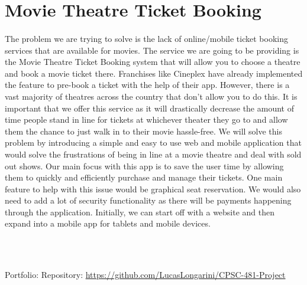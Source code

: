 \documentclass{article}
\begin{document}
\section{Movie Theatre Ticket Booking}
\paragraph{}
The problem we are trying to solve is the lack of online/mobile ticket booking services that are available for movies. The service we are going to be providing is the Movie Theatre Ticket Booking system that will allow you to choose a theatre and book a movie ticket there. Franchises like Cineplex have already implemented the feature to pre-book a ticket with the help of their app. However, there is a vast majority of theatres across the country that don’t allow you to do this. It is important that we offer this service as it will drastically decrease the amount of time people stand in line for tickets at whichever theater they go to and allow them the chance to just walk in to their movie hassle-free. We will solve this problem by introducing a simple and easy to use web and mobile application that would solve the frustrations of being in line at a movie theatre and deal with sold out shows. Our main focus with this app is to save the user time by allowing them to quickly and efficiently purchase and manage their tickets. One main feature to help with this issue would be graphical seat reservation. We would also need to add a lot of security functionality as there will be payments happening through the application. Initially,  we can start off with a website and then expand into a mobile app for tablets and mobile devices.

\\~\\

\begin{flushleft}  
Portfolio:
\newline
Repository: \url{https://github.com/LucasLongarini/CPSC-481-Project}
\end{flushleft}  
\end{document}
